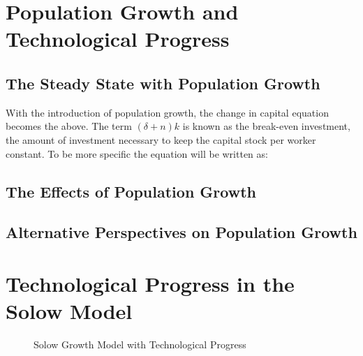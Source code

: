 \newpage


\section*{Population Growth and Technological Progress}


\subsection*{The Steady State with Population Growth}


\noindent With the introduction of population growth, the change in capital equation becomes the above. The term $(\delta + n)k$ is 
known as the break-even investment, the amount of investment necessary to keep the capital stock per worker constant. 
To be more specific the equation will be written as: 



\subsection*{The Effects of Population Growth}

\subsection*{Alternative Perspectives on Population Growth}

\section*{Technological Progress in the Solow Model}

\begin{figure}
    \centering

    \caption{Solow Growth Model with Technological Progress}
\end{figure}

